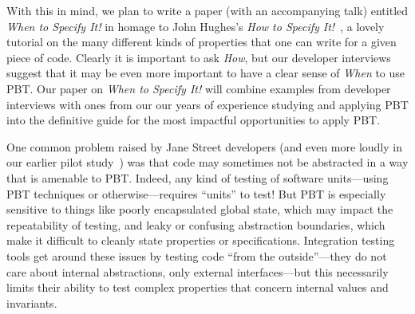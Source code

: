 With this in mind, we plan to write a paper
(with an accompanying talk)
entitled {\em When to Specify It!} in homage to
John Hughes's {\em How to Specify It!}~\cite{HowToSpecifyIt}, a lovely
tutorial on the many different kinds of properties that one can write
for a given piece
of code. Clearly it is important to ask {\em How}, but our developer interviews
suggest that it may be even more important to have a clear sense of {\em When}
to use PBT. Our paper on {\em When to Specify It!} will combine examples from developer
interviews with ones from our our years of experience studying and applying PBT
into the definitive guide for the most impactful opportunities to apply PBT.
\iflater{}
\fi

One common problem raised by Jane Street developers (and even more loudly
in our earlier pilot study~\cite{goldstein2022some}) was
that code may sometimes not be abstracted
in a way that is amenable to PBT. Indeed, any kind of
testing of software units---using PBT techniques or otherwise---requires
``units'' to test!  But PBT is
especially sensitive to things like poorly encapsulated global state, which may
impact the repeatability of testing, and leaky or confusing
abstraction boundaries, which make it difficult to cleanly state
properties or specifications. Integration testing tools get around these issues by
testing code ``from the outside''---they do not care about internal
abstractions, only external interfaces---but this necessarily limits their
ability to test complex properties that concern internal values and invariants.

